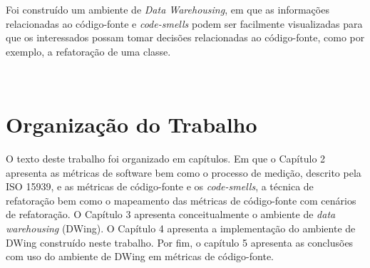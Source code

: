 	  Foi construído um ambiente de \textit{Data Warehousing}, em que as informações relacionadas ao código-fonte e \textit{code-smells} podem ser facilmente visualizadas para que os interessados possam tomar decisões relacionadas ao código-fonte, como por exemplo, a refatoração de uma classe.


\
	


\section{Organização do Trabalho}

O texto deste trabalho foi organizado em capítulos. Em que o Capítulo 2 apresenta as 
métricas de software bem como o processo de medição, descrito pela ISO 15939, 
e as métricas de código-fonte e os \textit{code-smells}, a técnica de refatoração bem como o mapeamento das métricas de código-fonte com cenários de refatoração. O Capítulo 3 apresenta conceitualmente o ambiente de \textit{data warehousing} (DWing). O Capítulo 4 apresenta a implementação do ambiente de DWing construído neste trabalho. Por fim, o capítulo 5 apresenta as conclusões com uso do 
ambiente de DWing em métricas de código-fonte. 